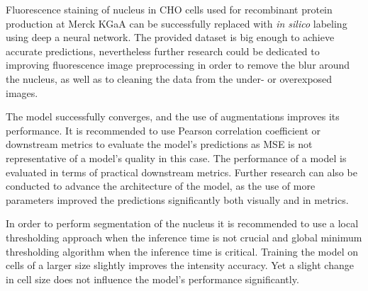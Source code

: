 Fluorescence staining of nucleus in CHO cells used for recombinant protein production at Merck KGaA can be successfully replaced with \textit{in silico} labeling using deep a neural network. The provided dataset is big enough to achieve accurate predictions, nevertheless further research could be dedicated to improving fluorescence image preprocessing in order to remove the blur around the nucleus, as well as to cleaning the data from the under- or overexposed images.

The model successfully converges, and the use of augmentations improves its performance. It is recommended to use Pearson correlation coefficient or downstream metrics to evaluate the model's predictions as MSE is not representative of a model's quality in this case. The performance of a model is evaluated in terms of practical downstream metrics. Further research can also be conducted to advance the architecture of the model, as the use of more parameters improved the predictions significantly both visually and in metrics.

In order to perform segmentation of the nucleus it is recommended to use a local thresholding approach when the inference time is not crucial and global minimum thresholding algorithm when the inference time is critical. Training the model on cells of a larger size slightly improves the intensity accuracy. Yet a slight change in cell size does not influence the model's performance significantly.
